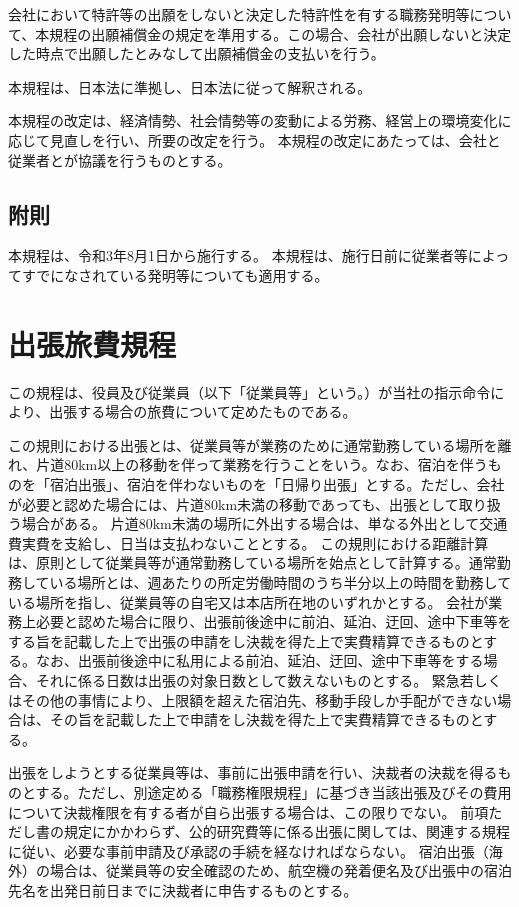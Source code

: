 \documentclass[10pt,a4paper,uplatex]{jsarticle}
\begin{document}
会社において特許等の出願をしないと決定した特許性を有する職務発明等について、本規程の出願補償金の規定を準用する。この場合、会社が出願しないと決定した時点で出願したとみなして出願補償金の支払いを行う。

本規程は、日本法に準拠し、日本法に従って解釈される。

本規程の改定は、経済情勢、社会情勢等の変動による労務、経営上の環境変化に応じて見直しを行い、所要の改定を行う。
\term 本規程の改定にあたっては、会社と従業者とが協議を行うものとする。

\subsection*{附則}
本規程は、令和3年8月1日から施行する。
本規程は、施行日前に従業者等によってすでになされている発明等についても適用する。

\clearpage
\section{出張旅費規程}

この規程は、役員及び従業員（以下「従業員等」という。）が当社の指示命令により、出張する場合の旅費について定めたものである。

この規則における出張とは、従業員等が業務のために通常勤務している場所を離れ、片道80km以上の移動を伴って業務を行うことをいう。なお、宿泊を伴うものを「宿泊出張」、宿泊を伴わないものを「日帰り出張」とする。ただし、会社が必要と認めた場合には、片道80km未満の移動であっても、出張として取り扱う場合がある。
\term 片道80km未満の場所に外出する場合は、単なる外出として交通費実費を支給し、日当は支払わないこととする。
\term この規則における距離計算は、原則として従業員等が通常勤務している場所を始点として計算する。通常勤務している場所とは、週あたりの所定労働時間のうち半分以上の時間を勤務している場所を指し、従業員等の自宅又は本店所在地のいずれかとする。
\term 会社が業務上必要と認めた場合に限り、出張前後途中に前泊、延泊、迂回、途中下車等をする旨を記載した上で出張の申請をし決裁を得た上で実費精算できるものとする。なお、出張前後途中に私用による前泊、延泊、迂回、途中下車等をする場合、それに係る日数は出張の対象日数として数えないものとする。
\term 緊急若しくはその他の事情により、上限額を超えた宿泊先、移動手段しか手配ができない場合は、その旨を記載した上で申請をし決裁を得た上で実費精算できるものとする。

出張をしようとする従業員等は、事前に出張申請を行い、決裁者の決裁を得るものとする。ただし、別途定める「職務権限規程」に基づき当該出張及びその費用について決裁権限を有する者が自ら出張する場合は、この限りでない。
\term 前項ただし書の規定にかかわらず、公的研究費等に係る出張に関しては、関連する規程に従い、必要な事前申請及び承認の手続を経なければならない。
\term 宿泊出張（海外）の場合は、従業員等の安全確認のため、航空機の発着便名及び出張中の宿泊先名を出発日前日までに決裁者に申告するものとする。
\end{document}
